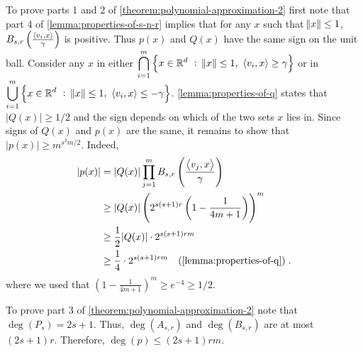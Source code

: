 To prove parts 1 and 2 of \autoref{theorem:polynomial-approximation-2} first
note that part 4 of \autoref{lemma:properties-of-s-n-r} implies that for any $x$
such that $\norm{x} \le 1$, $B_{s,r}\left( \frac{\left\langle v_i, x \right\rangle}{\gamma} \right)$
is positive. Thus $p(x)$ and $Q(x)$ have the same sign on the unit ball.
Consider any $x$ in either
$\displaystyle \bigcap_{i=1}^m \left\{ x \in \mathbb{R}^d ~:~ \norm{x} \le 1, \ \left\langle v_i, x \right\rangle \ge \gamma \right\}$
or in
$\displaystyle \bigcup_{i=1}^m \left\{ x \in \mathbb{R}^d ~:~ \norm{x} \le 1, \ \left\langle v_i, x \right\rangle \le - \gamma \right\}$.
\autoref{lemma:properties-of-q} states that $|Q(x)| \ge 1/2$ and the sign
depends on which of the two sets $x$ lies in. Since signs of $Q(x)$ and $p(x)$
are the same, it remains to show that $|p(x)| \ge m^{s^2m/2}$. Indeed,
\begin{align*}
|p(x)|
& = |Q(x)| \prod_{j=1}^m B_{s,r} \left( \frac{\ip{v_j}{x}}{\gamma} \right) \\
& \ge |Q(x)| \left( 2^{s(s+1)r} \left( 1 - \frac{1}{4m+1} \right) \right)^m \\
& \ge \frac{1}{2} |Q(x)| \cdot 2^{s(s+1)rm} \\
& \ge \frac{1}{4} \cdot 2^{s(s+1)rm} \quad \text{(\autoref{lemma:properties-of-q})} \; .
\end{align*}
where we used that $\left(1-\frac{1}{4m+1}\right)^m \ge e^{-4} \ge 1/2$.

To prove part 3 of \autoref{theorem:polynomial-approximation-2} note that
$\deg(P_s) = 2s+1$. Thus, $\deg(A_{s,r})$ and $\deg(B_{s,r})$ are at most
$(2s+1)r$. Therefore, $\deg(p) \le (2s+1) rm$.

